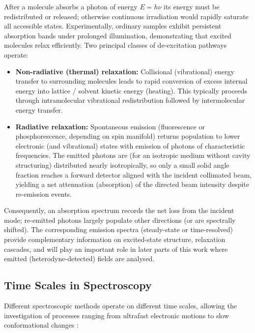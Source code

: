 \noindent After a molecule absorbs a photon of energy $E = h\nu$ its energy must be redistributed or released; otherwise continuous irradiation would rapidly saturate all accessible states. Experimentally, ordinary samples exhibit persistent absorption bands under prolonged illumination, demonstrating that excited molecules relax efficiently. Two principal classes of de-excitation pathways operate:
\begin{itemize}
	\item \textbf{Non-radiative (thermal) relaxation:} Collisional (vibrational) energy transfer to surrounding molecules leads to rapid conversion of excess internal energy into lattice / solvent kinetic energy (heating). This typically proceeds through intramolecular vibrational redistribution followed by intermolecular energy transfer.
	\item \textbf{Radiative relaxation:} Spontaneous emission (fluorescence or phosphorescence, depending on spin manifold) returns population to lower electronic (and vibrational) states with emission of photons of characteristic frequencies. The emitted photons are (for an isotropic medium without cavity structuring) distributed nearly isotropically, so only a small solid angle fraction reaches a forward detector aligned with the incident collimated beam, yielding a net attenuation (absorption) of the directed beam intensity despite re-emission events.
\end{itemize}

\noindent Consequently, an absorption spectrum records the net loss from the incident mode; re-emitted photons largely populate other directions (or are spectrally shifted). The corresponding emission spectra (steady-state or time-resolved) provide complementary information on excited-state structure, relaxation cascades, and will play an important role in later parts of this work where emitted (heterodyne-detected) fields are analysed.


\subsection{Time Scales in Spectroscopy}
\label{subsec:time_scales}

\noindent Different spectroscopic methods operate on different time scales, allowing the investigation of processes ranging from ultrafast electronic motions to slow conformational changes \cite{bogaczetal2025xrayabsorptionspectroscopy, fullerogilvie2015experimentalimplementationstwodimensional}:

